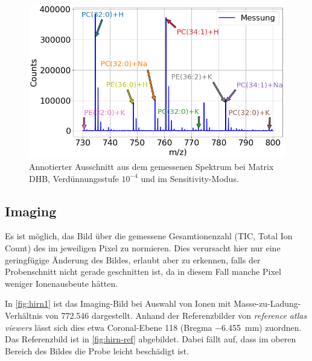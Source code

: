 \begin{figure}[!ht]
    \centering
    \includegraphics[width=1\textwidth]{img/overview_zoom-D02_Oben_S}
    \caption{Annotierter Ausschnitt aus dem gemessenen Spektrum bei Matrix DHB, Verdünnungsstufe $10^{-4}$ und im Sensitivity-Modus.}
    \label{fig:teilspekt}
\end{figure}


\subsection{Imaging}

Es ist möglich, das Bild über die gemessene Gesamtionenzahl (TIC, Total Ion Count) des im jeweiligen Pixel zu normieren. %
Dies verursacht hier nur eine geringfügige Änderung des Bildes, erlaubt aber zu erkennen, falls der Probenschnitt nicht gerade geschnitten ist, da in diesem Fall manche Pixel weniger Ionenausbeute hätten.

In \cref{fig:hirn1} ist das Imaging-Bild bei Auswahl von Ionen mit Masse-zu-Ladung-Verhältnis von \SI{772.546}{} dargestellt.
Anhand der Referenzbilder von \emph{reference atlas viewers} \cite{mouse-brain-map} lässt sich dies etwa Coronal-Ebene 118 (Bregma \SI{-6,455}{mm}) zuordnen.
Das Referenzbild ist in \cref{fig:hirn-ref} abgebildet.
Dabei fällt auf, dass im oberen Bereich des Bildes die Probe leicht beschädigt ist.

